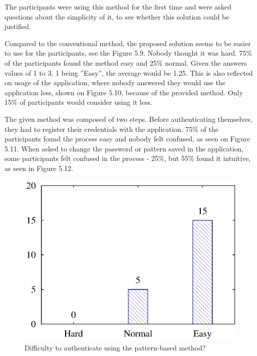 The participants were using this method for the first time and were asked questions about the simplicity of it, to see whether this solution could be justified. 

Compared to the conventional method, the proposed solution seems to be easier to use for the participants, see the Figure 5.9. Nobody thought it was hard. 75\% of the participants found the method easy and 25\% normal. Given the answers values of 1 to 3, 1 being ''Easy'', the average would be 1.25. This is also reflected on usage of the application, where nobody answered they would use the application less, shown on Figure 5.10, because of the provided method. Only 15\% of participants would consider using it less. 

The given method was composed of two steps. Before authenticating themselves, they had to register their credentials with the application. 75\% of the participants found the process easy and nobody felt confused, as seen on Figure 5.11. When asked to change the password or pattern saved in the application, some participants felt confused in the process - 25\%, but 55\% found it intuitive, as seen in Figure 5.12.

\begin{figure}[H]
\centering
\includegraphics[scale=.7]{files/question7/question7.eps}
\caption{Difficulty to authenticate using the pattern-based method?}
\label{fig:digraph}
\end{figure}

